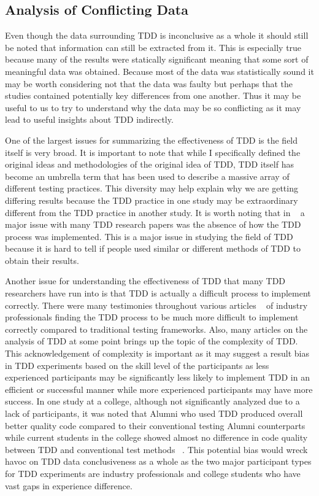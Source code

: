\documentclass{sig-alternate}
\begin{document}
\subsection{Analysis of Conflicting Data}
Even though the data surrounding TDD is inconclusive as a whole it should still be noted that information can still be extracted from it.  This is especially true because many of the results were statically significant meaning that some sort of meaningful data was obtained.   
Because most of the data was statistically sound it may be worth considering not that the data was faulty but perhaps that the studies contained potentially key differences from one another.  Thus it may be useful to us to try to understand why the data may be so conflicting as it may lead to useful insights about TDD indirectly.

One of the largest issues for summarizing the effectiveness of TDD is the field itself is very broad.  It is important to note that while I specifically defined the original ideas and methodologies of the original idea of TDD, TDD itself has become an umbrella term that has been used to describe a massive array of different testing practices.  This diversity may help explain why we are getting differing results because the TDD practice in one study may be extraordinary different from the TDD practice in another study.  It is worth noting that in ~\cite{Hammond:2012} a major issue with many TDD research papers was the absence of how the TDD process was implemented. This is a major issue in studying the field of TDD because it is hard to tell if people used similar or different methods of TDD to obtain their results.

Another issue for understanding the effectiveness of TDD that many TDD researchers have run into is that TDD is actually a difficult process to implement correctly.  There were many testimonies throughout various articles ~\cite{Hammond:2012, Hellman:2012, Kettunen:2010} of industry professionals finding the TDD process to be much more difficult to implement correctly compared to traditional testing frameworks.  Also, many articles on the analysis of TDD at some point brings up the topic of the complexity of TDD. This acknowledgement of complexity is important as it may suggest a result bias in TDD experiments based on the skill level of the participants as less experienced participants may be significantly less likely to implement TDD in an efficient or successful manner while more experienced participants may have more success.  In one study at a college, although not significantly analyzed due to a lack of participants, it was noted that Alumni who used TDD produced overall better quality code compared to their conventional testing Alumni counterparts while current students in the college showed almost no difference in code quality between TDD and conventional test methods ~\cite{Lemos:2012}.  This potential bias would wreck havoc on TDD data conclusiveness as a whole as the two major participant types for TDD experiments are industry professionals and college students who have vast gaps in experience difference.
\end{document}
